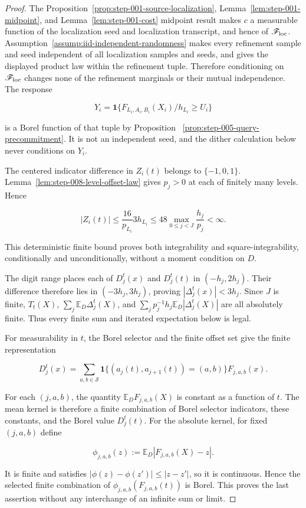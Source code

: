 \begin{proof}
The Proposition~\ref{prop:step-001-source-localization}, Lemma~\ref{lem:step-001-midpoint}, and Lemma~\ref{lem:step-001-cost} midpoint result makes \(c\) a measurable function of the localization seed and localization transcript, and hence of \(\mathscr F_{\rm loc}\). Assumption~\ref{assump:iid-independent-randomness} makes every refinement sample and seed independent of all localization samples and seeds, and gives the displayed product law within the refinement tuple. Therefore conditioning on \(\mathscr F_{\rm loc}\) changes none of the refinement marginals or their mutual independence. The response

\[
Y_i=\mathbf1\{F_{L_i,A_i,B_i}(X_i)/h_{L_i}\geq U_i\}
\]

is a Borel function of that tuple by Proposition~
\ref{prop:step-005-query-precommitment}. It is not an independent seed, and
the dither calculation below never conditions on \(Y_i\).

The centered indicator difference in \(Z_i(t)\) belongs to \(\{-1,0,1\}\). Lemma~\ref{lem:step-008-level-offset-law} gives \(p_j>0\) at each of finitely many levels. Hence

\[
|Z_i(t)|
\leq \frac{16}{p_{L_i}}3h_{L_i}
\leq48\max_{0\leq j<J}\frac{h_j}{p_j}<\infty.
\]

This deterministic finite bound proves both integrability and square-integrability, conditionally and unconditionally, without a moment condition on \(D\).

The digit range places each of \(D_j^t(x)\) and \(D_j^t(t)\) in \((-h_j,2h_j)\). Their difference therefore lies in \((-3h_j,3h_j)\), proving \(|\Delta_j^t(x)|<3h_j\). Since \(J\) is finite, \(T_t(X)\), \(\sum_j\mathbb E_D\Delta_j^t(X)\), and \(\sum_jp_j^{-1}h_j\mathbb E_D|\Delta_j^t(X)|\) are all absolutely finite. Thus every finite sum and iterated expectation below is legal.

For measurability in \(t\), the Borel selector and the finite offset set give the finite representation

\[
D_j^t(x)
=\sum_{a,b\in\mathcal S}
 \mathbf1\{(a_j(t),a_{j+1}(t))=(a,b)\}F_{j,a,b}(x).
\]

For each \((j,a,b)\), the quantity \(\mathbb E_DF_{j,a,b}(X)\) is constant as
a function of \(t\). The mean kernel is therefore a finite combination of
Borel selector indicators, these constants, and the Borel value \(D_j^t(t)\).
For the absolute kernel, for fixed \((j,a,b)\) define

\[
\phi_{j,a,b}(z):=\mathbb E_D|F_{j,a,b}(X)-z|.
\]

It is finite and satisfies \(|\phi(z)-\phi(z')|\leq|z-z'|\), so it is continuous. Hence the selected finite combination of \(\phi_{j,a,b}(F_{j,a,b}(t))\) is Borel. This proves the last assertion without any interchange of an infinite sum or limit.
\end{proof}

